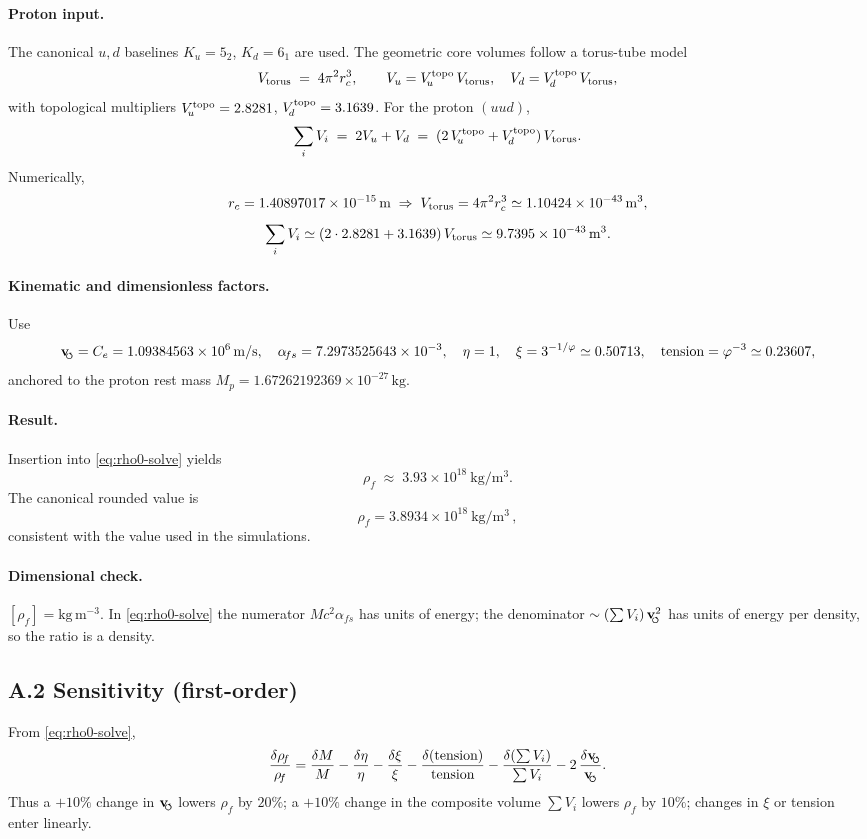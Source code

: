 \documentclass[11pt, preprint,titlepage]{revtex4-2}
\newcommand{\rhoF}{\rho_{\!f}}      %
\newcommand{\swirlarrow}{\!\!\scriptsize\boldsymbol{\circlearrowleft}}
\newcommand{\vswirl}{\mathbf{v}_{\swirlarrow}}
\begin{document}
	\paragraph{Proton input.}
	The canonical \(u,d\) baselines \(K_u=5_2\), \(K_d=6_1\) are used.
	The geometric core volumes follow a torus-tube model
	\[
		V_{\rm torus} \;=\; 4\pi^2 r_c^3,\qquad
		V_u = V_{\!u}^{\rm topo}\,V_{\rm torus},\quad V_d = V_{\!d}^{\rm topo}\,V_{\rm torus},
	\]
	with topological multipliers
	\(V_{\!u}^{\rm topo}=2.8281\), \(V_{\!d}^{\rm topo}=3.1639\).
	For the proton \((uud)\),
	\[
		\sum_i V_i \;=\; 2V_u + V_d \;=\; (2\,V_{\!u}^{\rm topo}+V_{\!d}^{\rm topo})\,V_{\rm torus}.
	\]
	Numerically,
	\[
		r_c = 1.40897017\times 10^{-15}\,\mathrm{m}
		\;\Rightarrow\;
		V_{\rm torus} = 4\pi^2 r_c^3 \simeq 1.10424\times10^{-43}\,\mathrm{m^3},
	\]
	\[
		\sum_i V_i \simeq (2\cdot 2.8281 + 3.1639)\,V_{\rm torus}
		\simeq 9.7395\times 10^{-43}\,\mathrm{m^3}.
	\]

	\paragraph{Kinematic and dimensionless factors.}
	Use
	\[
		\vswirl = C_e = 1.09384563\times10^6\,\mathrm{m/s},\quad
		\alpha_{\!fs}=7.2973525643\times10^{-3},\quad
		\eta=1,\quad \xi = 3^{-1/\varphi}\simeq 0.50713,\quad
		\text{tension} = \varphi^{-3} \simeq 0.23607,
	\]
	anchored to the proton rest mass \(M_p=1.67262192369\times10^{-27}\,\mathrm{kg}\).

	\paragraph{Result.}
	Insertion into \eqref{eq:rho0-solve} yields
	\[
		\rhoF \;\approx\; 3.93\times 10^{18}\ \mathrm{kg/m^3}.
	\]
	The canonical rounded value is
	\[
		\boxed{ \rhoF = 3.8934\times 10^{18}\ \mathrm{kg/m^3} }\,,
	\]
	consistent with the value used in the simulations.

	\paragraph{Dimensional check.}
	\([\rhoF]=\mathrm{kg\,m^{-3}}\).
	In \eqref{eq:rho0-solve} the numerator \(M c^2\alpha_{\!fs}\) has units of energy; the denominator
	\(\sim (\sum V_i)\,\vswirl^{2}\) has units of energy per density, so the ratio is a density.

	\subsection*{A.2 Sensitivity (first-order)}
	From \eqref{eq:rho0-solve},
	\[
		\frac{\delta\rhoF}{\rhoF}
		= \frac{\delta M}{M}
		- \frac{\delta\eta}{\eta}
		- \frac{\delta\xi}{\xi}
		- \frac{\delta(\text{tension})}{\text{tension}}
		- \frac{\delta(\sum V_i)}{\sum V_i}
		- 2\,\frac{\delta \vswirl}{\vswirl}.
	\]
	Thus a \(+10\%\) change in \(\vswirl\) lowers \(\rhoF\) by \(20\%\); a \(+10\%\) change in the composite volume \(\sum V_i\) lowers \(\rhoF\) by \(10\%\); changes in \(\xi\) or tension enter linearly.
\end{document}
